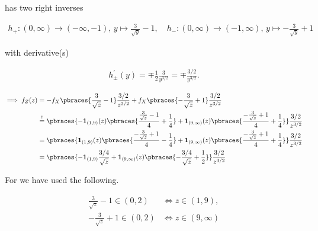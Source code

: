 \begin{solution}
\begin{enumerate}[label = (\alph*)]
    has two right inverses

    \begin{align*}
        h_+:
            (0, \infty) \to (-\infty, -1), \,
            y \mapsto \frac{3}{\sqrt y} - 1,
        \quad
        h_-:
            (0, \infty) \to (-1, \infty), \,
            y \mapsto -\frac{3}{\sqrt y} + 1
    \end{align*}

    with derivative(s)

    \begin{align*}
        h_\pm^\prime(y)
        =
        \mp \frac{1}{2} \frac{3}{y^{3 / 2}}
        =
        \mp \frac{3 / 2}{y^{3 / 2}}.
    \end{align*}

    \begin{align*}
        \implies
        f_Z(z)
        & =
        -
        f_X \pbraces{ \frac{3}{\sqrt z} - 1} \frac{3 / 2}{z^{3 / 2}}
        +
        f_X \pbraces{-\frac{3}{\sqrt z} + 1} \frac{3 / 2}{z^{3 / 2}} \\
        & \stackrel{!}{=}
        \pbraces
        {
            -
            \mathbf 1_{(1, 9)}(z)
            \pbraces
            {
                \frac{\frac{3}{\sqrt z} - 1}{4}
                +
                \frac{1}{4}
            }
            +
            \mathbf 1_{(9, \infty)}(z)
            \pbraces
            {
                \frac{-\frac{3}{\sqrt z} + 1}{4}
                +
                \frac{1}{4}
            }
        }
        \frac{3 / 2}{z^{3 / 2}} \\
        & =
        \pbraces
        {
            \mathbf 1_{(1, 9)}(z)
            \pbraces
            {
                \frac{-\frac{3}{\sqrt z} + 1}{4}
                -
                \frac{1}{4}
            }
            +
            \mathbf 1_{(9, \infty)}(z)
            \pbraces
            {
                \frac{-\frac{3}{\sqrt z} + 1}{4}
                +
                \frac{1}{4}
            }
        }
        \frac{3 / 2}{z^{3 / 2}} \\
        & =
        \pbraces
        {
            -
            \mathbf 1_{(1, 9)}
            \frac{3 / 4}{\sqrt z}
            +
            \mathbf 1_{(9, \infty)}(z)
            \pbraces
            {
                -\frac{3 / 4}{\sqrt z}
                +
                \frac{1}{2}
            }
        }
        \frac{3 / 2}{z^{3 / 2}}
    \end{align*}

    For \Quote{$!$} we have used the following.

    \begin{align*}
        \frac{3}{\sqrt z} - 1 \in (0, 2)
        & \iff
        z \in (1, 9), \\
        -\frac{3}{\sqrt z} + 1 \in (0, 2)
        & \iff
        z \in (9, \infty)
    \end{align*}

\end{enumerate}

\end{solution}

